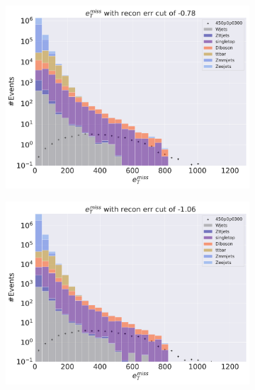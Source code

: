 \begin{figure}[H]
    \centering
    \begin{subfigure}{.45\textwidth}
        \includegraphics[width=\textwidth]{Figures/VAE_testing/big/2lep/b_data_recon_big_rm3_feats_sig_450p0p0300_recon_errcut_-0.78.pdf}
        \caption{ }
        \label{fig:VAE_2lep_big_450_cut_etmiss}
    \end{subfigure}
    \hfill
    \begin{subfigure}{.45\textwidth}
        \includegraphics[width=\textwidth]{Figures/VAE_testing/small/2lep/b_data_recon_big_rm3_feats_sig_450p0p0300_recon_errcut_-1.06.pdf}
        \caption{}
        \label{fig:VAE_2lep_small_450_cut_etmiss}
    \end{subfigure}

\end{figure}
